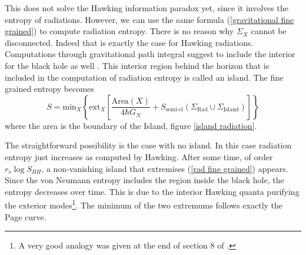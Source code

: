 This does not solve the Hawking information paradox yet, since it involves the entropy of radiations. However, we can use the same formula (\ref{gravitational fine grained}) to compute radiation entropy. There is no reason why $\Sigma_X$ cannot be disconnected. Indeed that is exactly the case for Hawking radiations. Computations through gravitational path integral suggest to include the interior for the black hole as well \cite{Marolf_2021}. This interior region behind the horizon that is included in the computation of radiation entropy is called an island. The fine grained entropy becomes
\begin{equation}\label{rad fine grained}
    S = \text{min}_X\left\{\text{ext}_X\left[\frac{\text{Area}\left(X\right)}{4\hbar G_N} + S_\text{semi-cl}\left(\Sigma_\text{Rad}\cup\Sigma_\text{Island}\right)\right]\right\}
\end{equation}
where the area is the boundary of the Island, figure \ref{island radiation}.

The straightforward possibility is the case with no island. In this case radiation entropy just increases as computed by Hawking. After some time, of order $r_s\log S_{BH}$, a non-vanishing island that extremises (\ref{rad fine grained}) appears. Since the von Neumann entropy includes the region inside the black hole, the entropy decreases over time. This is due to the interior Hawking quanta purifying the exterior modes\footnote{A very good analogy was given at the end of section 8 of \cite{almheiri2020entropy}.}. The minimum of the two extremums follows exactly the Page curve.
